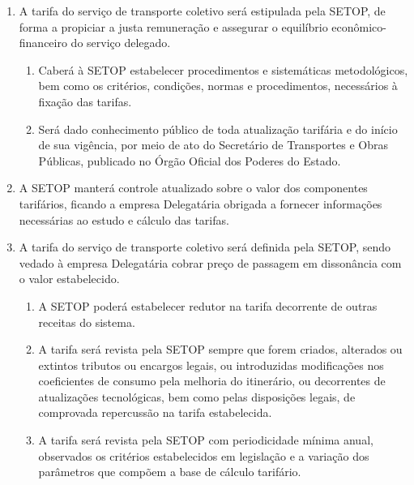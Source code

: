 \begin{enumerate}[resume, label=Art. \arabic*]

\item A tarifa do serviço de transporte coletivo será estipulada pela SETOP, de forma a propiciar a justa remuneração e assegurar o equilíbrio econômico-financeiro do serviço delegado.

\begin{enumerate}[label= \S \arabic*] %

\item Caberá à SETOP estabelecer procedimentos e sistemáticas metodológicos, bem como os critérios, condições, normas e procedimentos, necessários à fixação das tarifas.

\item Será dado conhecimento público de toda atualização tarifária e do início de sua vigência, por meio de ato do Secretário de Transportes e Obras Públicas, publicado no Órgão Oficial dos Poderes do Estado.

\end{enumerate}

\item A SETOP manterá controle atualizado sobre o valor dos componentes tarifários, ficando a empresa Delegatária obrigada a fornecer informações necessárias ao estudo e cálculo das tarifas.

\item A tarifa do serviço de transporte coletivo será definida pela SETOP, sendo vedado à empresa Delegatária cobrar preço de passagem em dissonância com o valor estabelecido.

\begin{enumerate}[label= \S \arabic*] %

\item A SETOP poderá estabelecer redutor na tarifa decorrente de outras receitas do sistema.

\item A tarifa será revista pela SETOP sempre que forem criados, alterados ou extintos tributos ou encargos legais, ou introduzidas modificações nos coeficientes de consumo pela melhoria do itinerário, ou decorrentes de atualizações tecnológicas, bem como pelas disposições legais, de comprovada repercussão na tarifa estabelecida.

\item A tarifa será revista pela SETOP com periodicidade mínima anual, observados os critérios estabelecidos em legislação e a variação dos parâmetros que compõem a base de cálculo tarifário.


\end{enumerate}
\end{enumerate}

